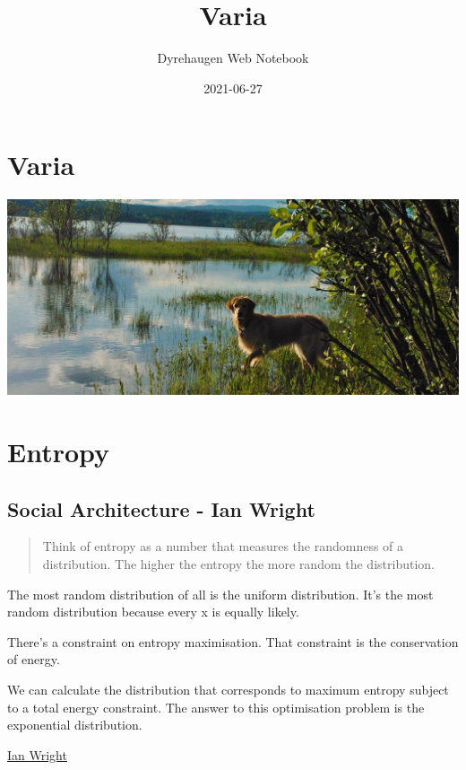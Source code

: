 \documentclass[
]{book}
\title{Varia}
\author{Dyrehaugen Web Notebook}
\date{2021-06-27}
\begin{document}
\maketitle

{
\setcounter{tocdepth}{1}
\tableofcontents
}
\hypertarget{varia}{%
\chapter{Varia}\label{varia}}

\includegraphics{fig/zelda.jpg}

\hypertarget{entropy}{%
\chapter{Entropy}\label{entropy}}

\hypertarget{social-architecture---ian-wright}{%
\section{Social Architecture - Ian Wright}\label{social-architecture---ian-wright}}

\begin{quote}
Think of entropy as a number that measures the randomness of a distribution.
The higher the entropy the more random the distribution.
\end{quote}

The most random distribution of all is the uniform distribution.
It's the most random distribution because every x is equally likely.

There's a constraint on entropy maximisation.
That constraint is the conservation of energy.

We can calculate the distribution that corresponds
to maximum entropy subject to a total energy constraint.
The answer to this optimisation problem is the exponential distribution.

\href{https://ianwrightsite.wordpress.com/2017/11/16/the-social-architecture-of-capitalism/}{Ian Wright}
\end{document}
